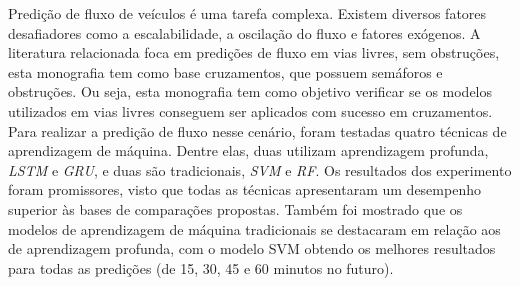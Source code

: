 Predição de fluxo de veículos é uma tarefa complexa. Existem diversos fatores desafiadores como a escalabilidade, a oscilação do fluxo e fatores exógenos. A literatura relacionada foca em predições de fluxo em vias livres, sem obstruções, esta monografia tem como base cruzamentos, que possuem semáforos e obstruções. Ou seja, esta monografia tem como objetivo verificar se os modelos utilizados em vias livres conseguem ser aplicados com sucesso em cruzamentos.  Para realizar a predição de fluxo nesse cenário, foram testadas quatro técnicas de aprendizagem de máquina. Dentre elas, duas utilizam aprendizagem profunda, \textit{\acrfull{LSTM}} e \textit{\acrfull{GRU}}, e duas são tradicionais, \textit{\acrfull{SVM}} e \textit{\acrfull{RF}}. Os resultados dos experimento foram promissores, visto que todas as técnicas apresentaram um desempenho superior às bases de comparações propostas. Também foi mostrado que os modelos de aprendizagem de máquina tradicionais se destacaram em relação aos de aprendizagem profunda, com o modelo \acrshort{SVM} obtendo os melhores resultados para todas as predições (de 15, 30, 45 e 60 minutos no futuro).